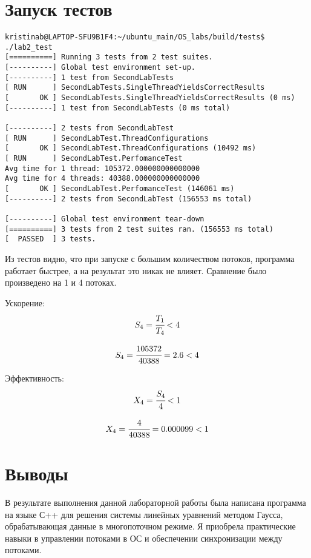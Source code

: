 \documentclass[a4paper, 12pt]{article}
\begin{document}
\section{Запуск тестов}
\begin{verbatim}
kristinab@LAPTOP-SFU9B1F4:~/ubuntu_main/OS_labs/build/tests$ ./lab2_test 
[==========] Running 3 tests from 2 test suites.
[----------] Global test environment set-up.
[----------] 1 test from SecondLabTests
[ RUN      ] SecondLabTests.SingleThreadYieldsCorrectResults
[       OK ] SecondLabTests.SingleThreadYieldsCorrectResults (0 ms)
[----------] 1 test from SecondLabTests (0 ms total)

[----------] 2 tests from SecondLabTest
[ RUN      ] SecondLabTest.ThreadConfigurations
[       OK ] SecondLabTest.ThreadConfigurations (10492 ms)
[ RUN      ] SecondLabTest.PerfomanceTest
Avg time for 1 thread: 105372.000000000000000
Avg time for 4 threads: 40388.000000000000000
[       OK ] SecondLabTest.PerfomanceTest (146061 ms)
[----------] 2 tests from SecondLabTest (156553 ms total)

[----------] Global test environment tear-down
[==========] 3 tests from 2 test suites ran. (156553 ms total)
[  PASSED  ] 3 tests.
\end{verbatim}
Из тестов видно, что при запуске с большим количеством потоков, программа работает быстрее, а на результат это никак не влияет. Сравнение было произведено на 1 и 4 потоках.

Ускорение:
\begin{equation}
  S_4 = \cfrac{T_1}{T_4} < 4
\end{equation}

\begin{equation}
    S_4 = \cfrac{105372}{40388} = 2.6 < 4
\end{equation}

Эффективность:
\begin{equation}
  X_4 = \cfrac{S_4}{4} < 1
\end{equation}

\begin{equation}
  X_4 = \cfrac{4}{40388} = 0.000099 < 1
\end{equation}

\newpage
\section{Выводы}

В результате выполнения данной лабораторной работы была написана программа на языке С++ для решения системы линейных уравнений методом Гаусса, обрабатывающая данные в многопоточном режиме. Я приобрела практические навыки в управлении потоками в ОС и обеспечении синхронизации между потоками.
\end{document}
